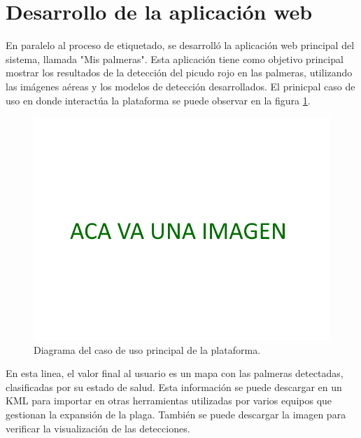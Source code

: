 
\section{Desarrollo de la aplicación web}
\label{sec:app_web}

En paralelo al proceso de etiquetado, se desarrolló la aplicación web principal del sistema, llamada "Mis palmeras". Esta aplicación tiene como objetivo principal mostrar los resultados de la detección del picudo rojo en las palmeras, utilizando las imágenes aéreas y los modelos de detección desarrollados. El prinicpal caso de uso en donde interactúa la plataforma se puede observar en la figura \ref{fig:caso-uso}.

\begin{figure}[H]
  \centering
  \includegraphics[scale=0.12]{./Figures/place-holder.png}
  \caption{Diagrama del caso de uso principal de la plataforma.}
  \label{fig:caso-uso}
\end{figure}

En esta linea, el valor final al usuario es un mapa con las palmeras detectadas, clasificadas por su estado de salud. Esta información se puede descargar en un KML para importar en otras herramientas utilizadas por varios equipos que gestionan la expansión de la plaga. También se puede descargar la imagen para verificar la visualización de las detecciones.

